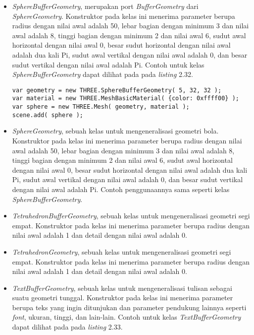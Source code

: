 \begin{itemize}
\begin{itemize}
	\item {\it SphereBufferGeometry}, merupakan port {\it BufferGeometry} dari {\it SphereGeometry}. Konstruktor pada kelas ini menerima parameter berupa radius dengan nilai awal adalah 50, lebar bagian dengan minimum 3 dan nilai awal adalah 8, tinggi bagian dengan minimum 2 dan nilai awal 6, sudut awal horizontal dengan nilai awal 0, besar sudut horizontal dengan nilai awal adalah dua kali Pi, sudut awal vertikal dengan nilai awal adalah 0, dan besar sudut vertikal dengan nilai awal adalah Pi. Contoh untuk kelas {\it SphereBufferGeometry} dapat dilihat pada pada {\it listing} 2.32.
	
\begin{lstlisting}[caption={Contoh penggunaan kelas {\it SphereBufferGeometry}.},captionpos=b]
var geometry = new THREE.SphereBufferGeometry( 5, 32, 32 );
var material = new THREE.MeshBasicMaterial( {color: 0xffff00} );
var sphere = new THREE.Mesh( geometry, material );
scene.add( sphere );
\end{lstlisting}

	\item {\it SphereGeometry}, sebuah kelas untuk mengeneralisasi geometri bola. Konstruktor pada kelas ini menerima parameter berupa radius dengan nilai awal adalah 50, lebar bagian dengan minimum 3 dan nilai awal adalah 8, tinggi bagian dengan minimum 2 dan nilai awal 6, sudut awal horizontal dengan nilai awal 0, besar sudut horizontal dengan nilai awal adalah dua kali Pi, sudut awal vertikal dengan nilai awal adalah 0, dan besar sudut vertikal dengan nilai awal adalah Pi. Contoh penggunaannya sama seperti kelas {\it SphereBufferGeometry}.
	
	\item {\it TetrahedronBufferGeometry}, sebuah kelas untuk mengeneralisasi geometri segi empat. Konstruktor pada kelas ini menerima parameter berupa radius dengan nilai awal adalah 1 dan detail dengan nilai awal adalah 0.
	
	\item {\it TetrahedronGeometry}, sebuah kelas untuk mengeneralisasi geometri segi empat. Konstruktor pada kelas ini menerima parameter berupa radius dengan nilai awal adalah 1 dan detail dengan nilai awal adalah 0.
	
	\item {\it TextBufferGeometry}, sebuah kelas untuk mengeneralisasi tulisan sebagai suatu geometri tunggal. Konstruktor pada kelas ini menerima parameter berupa teks yang ingin ditunjukan dan parameter pendukung lainnya seperti {\it font}, ukuran, tinggi, dan lain-lain. Contoh untuk kelas {\it TextBufferGeometry} dapat dilihat pada pada {\it listing} 2.33.
	

\end{itemize}
\end{itemize}
